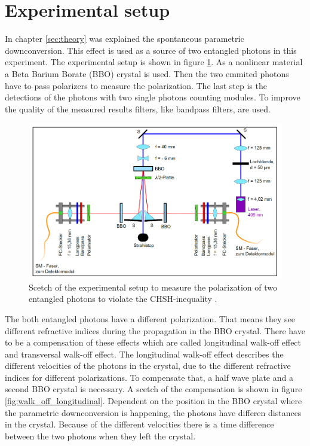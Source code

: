 \section{Experimental setup}\label{sec:setup}
In chapter \ref{sec:theory} was explained the spontaneous parametric downconversion. This effect is used as a source of two entangled photons in this experiment. The experimental setup is shown in figure \ref{fig:setup}. As a nonlinear material a Beta Barium Borate (BBO) crystal is used. Then the two emmited photons have to pass polarizers to measure the polarization.  The last step is the detections of the photons with two single photons counting modules.
To improve the quality of the measured results filters, like bandpass filters, are used.
\begin{figure}[H]
\centering
\includegraphics[scale=0.2]{figures/setup.PNG}
\caption{Scetch of the experimental setup to measure the polarization of two entangled photons to violate the CHSH-inequality \cite{barz}.   }
\label{fig:setup}
\end{figure}
The both entangled photons have a different polarization. That means they see different refractive indices during the propagation in the BBO crystal. There have to be a compensation of these effects which are called longitudinal walk-off effect and transversal walk-off effect.
The longitudinal walk-off effect describes the different velocities of the photons in the crystal, due to the different refractive indices for different polarizations. To compensate that, a half wave plate and a second BBO crystal is necessary. A scetch of the compensation is shown in figure \ref{fig:walk_off_longitudinal}. Dependent on the position in the BBO crystal where the parametric downconversion is happening, the photons have differen distances in the crystal. Because of the different velocities there is a time difference between the two photons when they left the crystal.   
